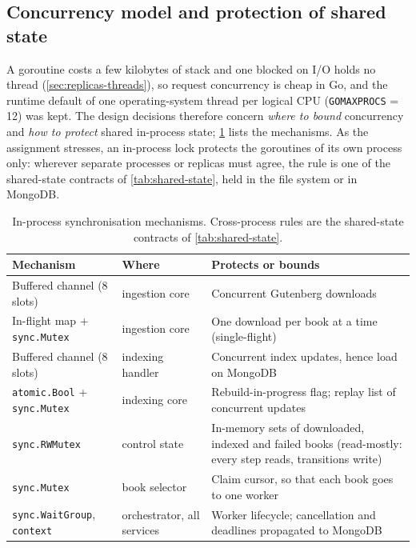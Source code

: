 \documentclass[10pt,a4paper]{article}
\newcommand{\code}[1]{\texttt{#1}}
\begin{document}
\subsection{Concurrency model and protection of shared state}
\label{sec:decision-concurrency}

A goroutine costs a few kilobytes of stack and one blocked on I/O holds no
thread (\cref{sec:replicas-threads}), so request concurrency is cheap in Go,
and the runtime default of one operating-system thread per logical CPU
(\code{GOMAXPROCS} = 12) was kept. The design decisions therefore concern
\emph{where to bound} concurrency and \emph{how to protect} shared in-process
state; \cref{tab:primitives} lists the mechanisms. As the assignment stresses,
an in-process lock protects the goroutines of its own process only: wherever
separate processes or replicas must agree, the rule is one of the shared-state
contracts of \cref{tab:shared-state}, held in the file system or in MongoDB.

\begin{table}[htbp]
  \centering
  \footnotesize
  \caption{In-process synchronisation mechanisms. Cross-process rules are the
  shared-state contracts of \cref{tab:shared-state}.}
  \label{tab:primitives}
  \begin{tabularx}{\textwidth}{@{}>{\raggedright\arraybackslash}p{3.7cm}>{\raggedright\arraybackslash}p{3.1cm}>{\raggedright\arraybackslash}X@{}}
    \toprule
    Mechanism & Where & Protects or bounds \\
    \midrule
    Buffered channel (8 slots) & ingestion core & Concurrent Gutenberg downloads \\
    In-flight map + \code{sync.Mutex} & ingestion core & One download per book at a time (single-flight) \\
    Buffered channel (8 slots) & indexing handler & Concurrent index updates, hence load on MongoDB \\
    \code{atomic.Bool} + \code{sync.Mutex} & indexing core & Rebuild-in-progress flag; replay list of concurrent updates \\
    \code{sync.RWMutex} & control state & In-memory sets of downloaded, indexed and failed books (read-mostly: every step reads, transitions write) \\
    \code{sync.Mutex} & book selector & Claim cursor, so that each book goes to one worker \\
    \code{sync.WaitGroup}, \code{context} & orchestrator, all services & Worker lifecycle; cancellation and deadlines propagated to MongoDB \\
    \bottomrule
  \end{tabularx}
\end{table}
\end{document}
